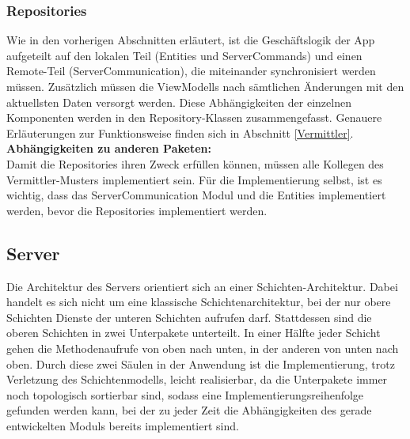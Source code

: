 \documentclass[11pt,a4paper]{article}
\begin{document}
\subsubsection{Repositories}
Wie in den vorherigen Abschnitten erläutert, ist die Geschäftslogik der App aufgeteilt auf den lokalen Teil (Entities und ServerCommands) und einen Remote-Teil (ServerCommunication), die miteinander synchronisiert werden müssen. Zusätzlich müssen die ViewModells nach sämtlichen Änderungen mit den aktuellsten Daten versorgt werden. Diese Abhängigkeiten der einzelnen Komponenten werden in den Repository-Klassen zusammengefasst. Genauere Erläuterungen zur Funktionsweise finden sich in Abschnitt \ref{Vermittler}.\\

\textbf{Abhängigkeiten zu anderen Paketen:}\\
Damit die Repositories ihren Zweck erfüllen können, müssen alle Kollegen des Vermittler-Musters implementiert sein. Für die Implementierung selbst, ist es wichtig, dass das ServerCommunication Modul und die Entities implementiert werden, bevor die Repositories implementiert werden.\\

\subsection{Server}
Die Architektur des Servers orientiert sich an einer Schichten-Architektur. Dabei handelt es sich nicht um eine klassische Schichtenarchitektur, bei der nur obere Schichten Dienste der unteren Schichten aufrufen darf. Stattdessen sind die oberen Schichten in zwei Unterpakete unterteilt. In einer Hälfte jeder Schicht gehen die Methodenaufrufe von oben nach unten, in der anderen von unten nach oben. Durch diese zwei Säulen in der Anwendung ist die Implementierung, trotz Verletzung des Schichtenmodells, leicht realisierbar, da die Unterpakete immer noch topologisch sortierbar sind, sodass eine Implementierungsreihenfolge gefunden werden kann, bei der zu jeder Zeit die Abhängigkeiten des gerade entwickelten Moduls bereits implementiert sind.\\
\end{document}
